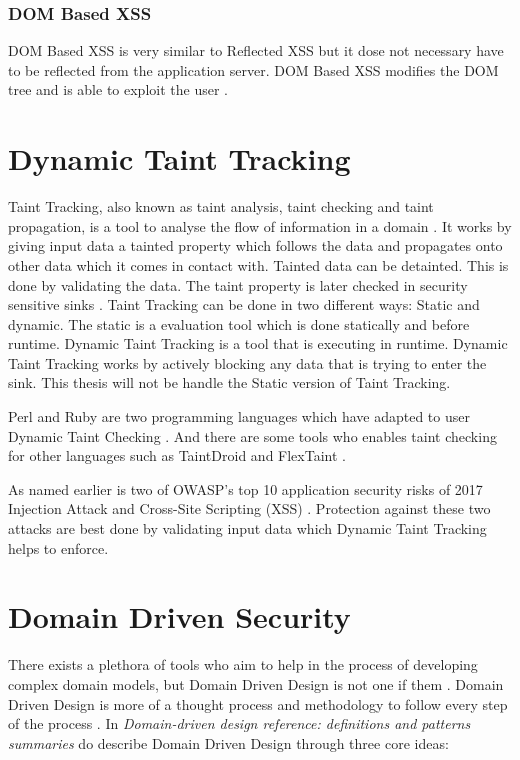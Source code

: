 \subsubsection{DOM Based XSS}
DOM Based XSS is very similar to Reflected XSS but it dose not necessary have to be reflected from the application server. DOM Based XSS modifies the DOM tree and is able to exploit the user \parencite{Secure_Web}.


\section{Dynamic Taint Tracking}
\label{DynamicTaintTracking}
Taint Tracking, also known as taint analysis, taint checking and taint propagation, is a tool to analyse the flow of information in a domain \parencite{Pan2015}. It works by giving input data a tainted property which follows the data and propagates onto other data which it comes in contact with. Tainted data can be detainted. This is done by validating the data. The taint property is later checked in security sensitive sinks \parencite{Pan2015}. Taint Tracking can be done in two different ways: Static and dynamic. The static is a evaluation tool which is done statically and before runtime. Dynamic Taint Tracking is a tool that is executing in runtime. Dynamic Taint Tracking works by actively blocking any data that is trying to enter the sink. This thesis will not be handle the Static version of Taint Tracking. 

Perl and Ruby are two programming languages which have adapted to user Dynamic Taint Checking \parencite{perl, ruby}. And there are some tools who enables taint checking for other languages such as TaintDroid \parencite{Ma2010} and FlexTaint \parencite{Venkataramani2008}.

As named earlier is two of OWASP's top 10 application security risks of 2017 Injection Attack and Cross-Site Scripting (XSS) \parencite{OWASP2017}. Protection against these two attacks are best done by validating input data which Dynamic Taint Tracking helps to enforce.


\section{Domain Driven Security}
\label{DomainDrivenSecurity}
There exists a plethora of tools who aim to help in the process of developing complex domain models, but Domain Driven Design is not one if them \parencite{Bankes, 10.1007/978-3-319-24309-2_33}. Domain Driven Design is more of a thought process and methodology to follow every step of the process \parencite{EvansEric2004Dd:t}. In \emph{Domain-driven design reference: definitions and patterns summaries} do \textcite{evans_2015} describe Domain Driven Design through three core ideas:

